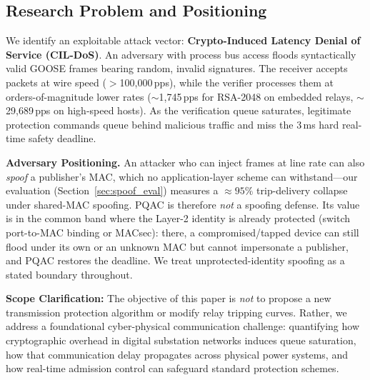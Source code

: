 \documentclass[journal]{IEEEtran}
\begin{document}
\subsection{Research Problem and Positioning}
We identify an exploitable attack vector: \textbf{Crypto-Induced Latency Denial of Service (CIL-DoS)}. An adversary with process bus access floods syntactically valid GOOSE frames bearing random, invalid signatures. The receiver accepts packets at wire speed ($>$100,000\,pps), while the verifier processes them at orders-of-magnitude lower rates ($\sim$1,745\,pps for RSA-2048 on embedded relays, $\sim$29,689\,pps on high-speed hosts). As the verification queue saturates, legitimate protection commands queue behind malicious traffic and miss the 3\,ms hard real-time safety deadline.

\textbf{Adversary Positioning.} An attacker who can inject frames at line rate can also \emph{spoof} a publisher's MAC, which no application-layer scheme can withstand---our evaluation (Section~\ref{sec:spoof_eval}) measures a $\approx 95\%$ trip-delivery collapse under shared-MAC spoofing. PQAC is therefore \emph{not} a spoofing defense. Its value is in the common band where the Layer-2 identity is already protected (switch port-to-MAC binding or MACsec): there, a compromised/tapped device can still flood under its own or an unknown MAC but cannot impersonate a publisher, and PQAC restores the deadline. We treat unprotected-identity spoofing as a stated boundary throughout.

\textbf{Scope Clarification:} The objective of this paper is \emph{not} to propose a new transmission protection algorithm or modify relay tripping curves. Rather, we address a foundational cyber-physical communication challenge: quantifying how cryptographic overhead in digital substation networks induces queue saturation, how that communication delay propagates across physical power systems, and how real-time admission control can safeguard standard protection schemes.
\end{document}
